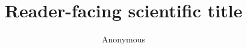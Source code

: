 \documentclass[aps,pre,reprint]{revtex4-2}
\begin{document}
\title{Reader-facing scientific title}
\author{Anonymous}
\begin{abstract}
\end{abstract}
\maketitle
\FloatBarrier

\FloatBarrier
\end{document}
